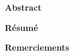 

\begin{center}
\textbf{Abstract} 
\end{center} 

\vspace*{2cm}

\begin{center}
\textbf{Résumé} 
\end{center} 

\newpage

\vspace*{2cm}

\begin{center}
\textbf{Remerciements} 
\end{center} 
